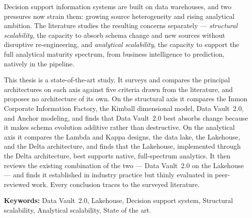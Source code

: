 
Decision support information systems are built on data warehouses, and two pressures now
strain them: growing source heterogeneity and rising analytical ambition. The literature
studies the resulting concerns separately --- \textit{structural scalability}, the capacity
to absorb schema change and new sources without disruptive re-engineering, and
\textit{analytical scalability}, the capacity to support the full analytical maturity
spectrum, from business intelligence to prediction, natively in the pipeline.

This thesis is a state-of-the-art study. It surveys and compares the principal architectures
on each axis against five criteria drawn from the literature, and proposes no architecture of
its own. On the structural axis it compares the Inmon Corporate Information Factory, the Kimball
dimensional model, Data Vault~2.0, and Anchor modeling, and finds that Data Vault~2.0 best
absorbs change because it makes schema evolution additive rather than destructive. On the
analytical axis it compares the Lambda and Kappa designs, the data lake, the Lakehouse, and
the Delta architecture, and finds that the Lakehouse, implemented through the Delta
architecture, best supports native, full-spectrum analytics. It then reviews the existing
combination of the two --- Data Vault~2.0 on the Lakehouse --- and finds it established in
industry practice but thinly evaluated in peer-reviewed work. Every conclusion traces to the
surveyed literature.

\bigskip
\vspace{0.5cm}

\noindent\textbf{Keywords:} Data Vault~2.0, Lakehouse, Decision support system,
Structural scalability, Analytical scalability, State of the art.
